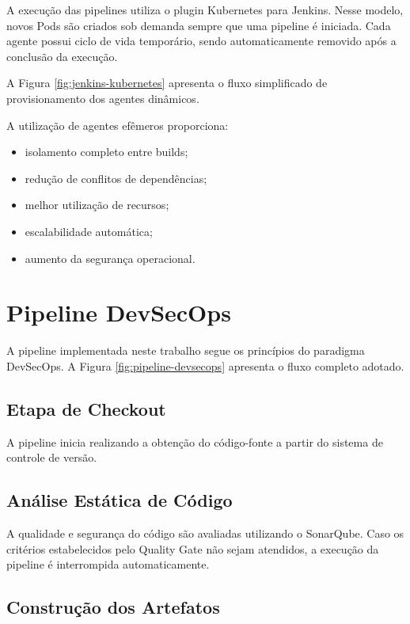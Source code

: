 A execução das pipelines utiliza o plugin Kubernetes para Jenkins. Nesse modelo, novos Pods são criados sob demanda sempre que uma pipeline é iniciada. Cada agente possui ciclo de vida temporário, sendo automaticamente removido após a conclusão da execução.

A Figura \ref{fig:jenkins-kubernetes} apresenta o fluxo simplificado de provisionamento dos agentes dinâmicos.



A utilização de agentes efêmeros proporciona:

\begin{itemize}
    \item isolamento completo entre builds;
    \item redução de conflitos de dependências;
    \item melhor utilização de recursos;
    \item escalabilidade automática;
    \item aumento da segurança operacional.
\end{itemize}

\section{Pipeline DevSecOps}

A pipeline implementada neste trabalho segue os princípios do paradigma DevSecOps. A Figura \ref{fig:pipeline-devsecops} apresenta o fluxo completo adotado.



\subsection{Etapa de Checkout}

A pipeline inicia realizando a obtenção do código-fonte a partir do sistema de controle de versão.

\subsection{Análise Estática de Código}

A qualidade e segurança do código são avaliadas utilizando o SonarQube. Caso os critérios estabelecidos pelo Quality Gate não sejam atendidos, a execução da pipeline é interrompida automaticamente.

\subsection{Construção dos Artefatos}

